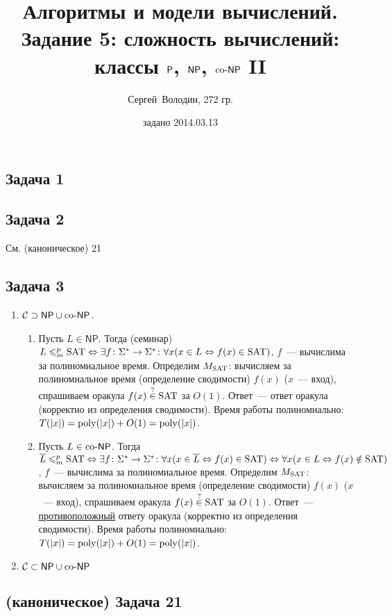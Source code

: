 \documentclass[a4paper]{article}
\date{задано 2014.03.13}
\author{Сергей~Володин, 272 гр.}
\title{Алгоритмы и модели вычислений.\\Задание 5: сложность вычислений: классы ${\mathsf{P}}$, $\NP$, $\coNP$ II}
\def\C{{\cal C}}
\def\NP{{\mathsf{NP}}}
\def\coNP{{\rm co}\text{-}{\mathsf{NP}}}
\def\SAT{{\rm{SAT}}}
\def\poly{{\rm{poly}}}
\begin{document}
\maketitle
\subsection*{Задача 1}
\subsection*{Задача 2}
См. (каноническое) 21
\subsection*{Задача 3}
\begin{enumerate}
\item $\C\supset \NP\cup\coNP$.\begin{enumerate}
\item Пусть $L\in\NP$. Тогда (семинар) $L\leqslant_m^p\SAT\Leftrightarrow \exists f\colon\Sigma^*\to\Sigma^*\colon\forall x(x\in L\Leftrightarrow f(x)\in\SAT)$, $f$~--- вычислима за полиномиальное время. Определим $M_{\SAT}$: вычисляем за полиномиальное время (определение сводимости) $f(x)$ ($x$~--- вход), спрашиваем оракула $f(x)\overset{?}{\in}\SAT$ за $O(1)$. Ответ~--- ответ оракула (корректно из определения сводимости).  Время работы полиномиально: $T(|x|)=\poly(|x|)+O(1)=\poly(|x|)$.
\item Пусть $L\in\coNP$. Тогда $\overline{L}\leqslant_m^p\SAT\Leftrightarrow \exists f\colon\Sigma^*\to\Sigma^*\colon\forall x(x\in \overline{L}\Leftrightarrow f(x)\in\SAT)\Leftrightarrow\forall x(x\in L\Leftrightarrow f(x)\notin\SAT)$, $f$~--- вычислима за полиномиальное время. Определим $M_{\SAT}$: вычисляем за полиномиальное время (определение сводимости) $f(x)$ ($x$~--- вход), спрашиваем оракула $f(x)\overset{?}{\in}\SAT$ за $O(1)$. Ответ~--- \underline{противоположный} ответу оракула (корректно из определения сводимости). Время работы полиномиально: $T(|x|)=\poly(|x|)+O(1)=\poly(|x|)$.
\end{enumerate}
\item $\C\subset\NP\cup\coNP$
\end{enumerate}
\subsection*{(каноническое) Задача 21}
\end{document}
